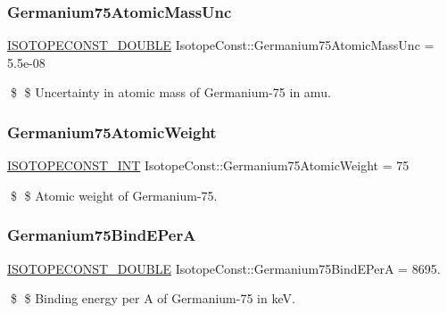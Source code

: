 \subsubsection{\texorpdfstring{Germanium75\+Atomic\+Mass\+Unc}{Germanium75AtomicMassUnc}}
{\footnotesize\ttfamily \mbox{\hyperlink{group___isotope_const-_macros_ga8f45a7272ce02c0b4c65c44636ed719a}{I\+S\+O\+T\+O\+P\+E\+C\+O\+N\+S\+T\+\_\+\+D\+O\+U\+B\+LE}} Isotope\+Const\+::\+Germanium75\+Atomic\+Mass\+Unc = 5.\+5e-\/08}

\$ \$ Uncertainty in atomic mass of Germanium-\/75 in amu. \mbox{\label{group___isotope_const-_germanium-_ge75_gae432674adb54659ac0b3bb09eb4b673a}} 
\subsubsection{\texorpdfstring{Germanium75\+Atomic\+Weight}{Germanium75AtomicWeight}}
{\footnotesize\ttfamily \mbox{\hyperlink{group___isotope_const-_macros_ga5f18360b3e99483a35c32d789e62621c}{I\+S\+O\+T\+O\+P\+E\+C\+O\+N\+S\+T\+\_\+\+I\+NT}} Isotope\+Const\+::\+Germanium75\+Atomic\+Weight = 75}

\$ \$ Atomic weight of Germanium-\/75. \mbox{\label{group___isotope_const-_germanium-_ge75_ga3743d33995a3914082559204e798dec9}} 
\subsubsection{\texorpdfstring{Germanium75\+Bind\+E\+PerA}{Germanium75BindEPerA}}
{\footnotesize\ttfamily \mbox{\hyperlink{group___isotope_const-_macros_ga8f45a7272ce02c0b4c65c44636ed719a}{I\+S\+O\+T\+O\+P\+E\+C\+O\+N\+S\+T\+\_\+\+D\+O\+U\+B\+LE}} Isotope\+Const\+::\+Germanium75\+Bind\+E\+PerA = 8695.}

\$ \$ Binding energy per A of Germanium-\/75 in keV. \mbox{\label{group___isotope_const-_germanium-_ge75_ga6870b1cd9c4d2f1209b4e8f680486ae8}} 
